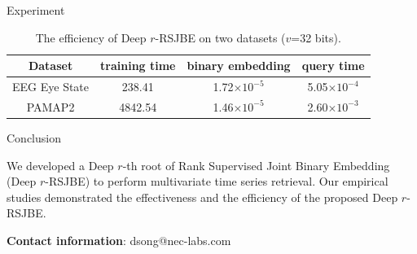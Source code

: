 \documentclass[final]{beamer}
\newlength{\onecolwid}
\begin{document}
\begin{frame}[t]
\begin{columns}[t]
\begin{column}{\onecolwid}
\begin{block}{Experiment}
  \vspace{-5mm}
 \vspace{-10mm}
  \begin{table} \scriptsize
  \caption{The efficiency of Deep $r$-RSJBE on two datasets ($v$=32 bits).}
  \label{tab:freq}
  \begin{tabular}{|c|c|c|c|}
    \hline
    Dataset & training time & binary embedding & query time\\
    \hline \hline
    EEG Eye State & 238.41 &  1.72$\times10^{-5}$ &  5.05$\times10^{-4}$ \\ \hline
    PAMAP2  & 4842.54 & 1.46$\times10^{-5}$ &  2.60$\times10^{-3}$ \\ \hline
\end{tabular}
\end{table}
 \vspace{-10mm}
\end{block}





\begin{alertblock}{Conclusion}

We developed a Deep $r$-th root of Rank Supervised Joint Binary Embedding (Deep $r$-RSJBE) to perform multivariate time series retrieval. 
Our empirical studies demonstrated the effectiveness and the efficiency of the proposed Deep $r$-RSJBE.
\end{alertblock}\vspace{-10mm}
\textbf{Contact information}: dsong@nec-labs.com

\end{column} %

\end{columns} %

\end{frame} %
\end{document}
